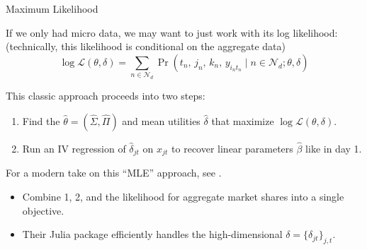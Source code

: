 \documentclass[aspectratio=169,t,11pt,table]{beamer}
\begin{document}
\begin{frame}{Maximum Likelihood}
    \begin{wideitemize}
        \item If we only had micro data, we may want to just work with its log likelihood: \\
        (technically, this likelihood is conditional on the aggregate data)
        \begin{equation*}
            \log\mathcal{L}(\theta, \delta) = \sum_{n \in \mathcal{N}_d} \Pr(t_n, \, j_n, \, k_n, \, y_{i_nt_n} \mid n \in \mathcal{N}_d; \theta, \delta)
        \end{equation*}
        \item This classic approach proceeds into two steps:
        \begin{enumerate}
            \item Find the $\hat{\theta} = (\hat{\Sigma}, \hat{\Pi})$ and mean utilities $\hat{\delta}$ that maximize $\log\mathcal{L}(\theta, \delta)$.
            \item Run an IV regression of $\hat{\delta}_{jt}$ on $x_{jt}$ to recover linear parameters $\hat{\beta}$ like in day 1.
        \end{enumerate}
        \pause
        \item For a modern take on this ``MLE'' approach, see \cite*{grieco2022conformant}.
        \begin{itemize}
            \item Combine 1, 2, and the likelihood for aggregate market shares into a single objective.
            \item Their Julia package efficiently handles the high-dimensional $\delta = \{\delta_{jt}\}_{j,t}$.
        \end{itemize}
    \end{wideitemize}
\end{frame}
\end{document}
